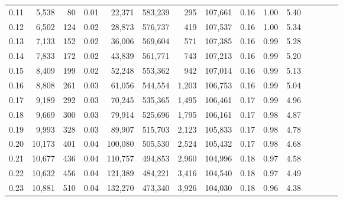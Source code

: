 \begin{tabular}{rrrcrrrrrrrrrrr}
0.11 &   5,538 &     80 &                                       0.01 &   22,371 &  583,239 &      295 &  107,661 &  0.16 &  1.00 &                         5.40 \\
0.12 &   6,502 &    124 &                                       0.02 &   28,873 &  576,737 &      419 &  107,537 &  0.16 &  1.00 &                         5.34 \\
0.13 &   7,133 &    152 &                                       0.02 &   36,006 &  569,604 &      571 &  107,385 &  0.16 &  0.99 &                         5.28 \\
0.14 &   7,833 &    172 &                                       0.02 &   43,839 &  561,771 &      743 &  107,213 &  0.16 &  0.99 &                         5.20 \\
0.15 &   8,409 &    199 &                                       0.02 &   52,248 &  553,362 &      942 &  107,014 &  0.16 &  0.99 &                         5.13 \\
0.16 &   8,808 &    261 &                                       0.03 &   61,056 &  544,554 &    1,203 &  106,753 &  0.16 &  0.99 &                         5.04 \\
0.17 &   9,189 &    292 &                                       0.03 &   70,245 &  535,365 &    1,495 &  106,461 &  0.17 &  0.99 &                         4.96 \\
0.18 &   9,669 &    300 &                                       0.03 &   79,914 &  525,696 &    1,795 &  106,161 &  0.17 &  0.98 &                         4.87 \\
0.19 &   9,993 &    328 &                                       0.03 &   89,907 &  515,703 &    2,123 &  105,833 &  0.17 &  0.98 &                         4.78 \\
0.20 &  10,173 &    401 &                                       0.04 &  100,080 &  505,530 &    2,524 &  105,432 &  0.17 &  0.98 &                         4.68 \\
0.21 &  10,677 &    436 &                                       0.04 &  110,757 &  494,853 &    2,960 &  104,996 &  0.18 &  0.97 &                         4.58 \\
0.22 &  10,632 &    456 &                                       0.04 &  121,389 &  484,221 &    3,416 &  104,540 &  0.18 &  0.97 &                         4.49 \\
0.23 &  10,881 &    510 &                                       0.04 &  132,270 &  473,340 &    3,926 &  104,030 &  0.18 &  0.96 &                         4.38 \\

\end{tabular}
